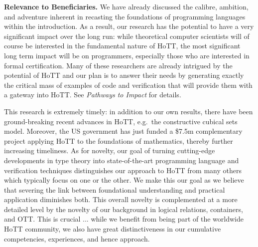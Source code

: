 \documentclass[a4paper,11pt]{article}
\newcommand{\eg}{{e.g.}\ }
\begin{document}
\vspace*{-0.1in}


{\bf Relevance to Beneficiaries.} We have already discussed the
calibre, ambition, and adventure inherent in recasting the foundations
of programming languages within the 
introduction. As a result, our research has the potential to have a
very significant impact over the long run: while theoretical computer
scientists will of course be interested in the fundamental nature of
HoTT, the most significant long term impact will be on programmers, especially those who
are interested in formal certification. Many of these researchers are
already intrigued by the potential of HoTT and our plan is to answer
their needs by generating
exactly the critical mass of examples of code and verification that
will provide them with a gateway into HoTT. See {\em Pathways to
  Impact} for details.


 This research is extremely timely:
in addition to our own results, there have been ground-breaking
recent advances in HoTT, \eg the constructive cubical sets model. Moreover, the
US government has just funded a \$7.5m complementary project applying
HoTT to the foundations of mathematics, thereby further increasing
timeliness. As for novelty, our goal of turning cutting-edge
developments in type theory into state-of-the-art programming language
and verification techniques distinguishes our approach to HoTT from
many others which typically focus on one or the other. We make this
our goal as we believe that severing the link between foundational
understanding and practical application diminishes both. This overall
novelty is complemented at a more detailed level by the novelty of our
background in logical relations, containers, and OTT. This is crucial
... while we benefit from being part of the worldwide HoTT community,
we also have great distinctiveness in our cumulative
competencies, experiences, and hence approach.
 
\end{document}
